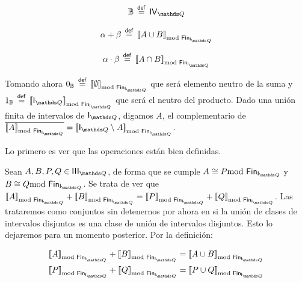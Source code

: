 \documentclass[final,12pt,a4paper,twoside,fleqn]{extbook}
\newcommand{\mathdef}{\ensuremath{\stackrel{\mathsf{def}}{{}={}}}}
\newcommand{\setB}{\ensuremath{\mathbb{B}}}
\theoremstyle{definition}
\theoremstyle{remark}
\begin{document}
\begin{equation}
\setB \mathdef \IVQ
\end{equation}



\begin{equation} 
\alpha + \beta \mathdef \ClEqFinDiff{A \cup B} 
\end{equation}



\begin{equation} 
\alpha \cdot \beta \mathdef \ClEqFinDiff{A \cap B} 
\end{equation} 



	Tomando ahora \( 0_{\setB} \mathdef \ClEqFinDiff{ \emptyset } \) que será
elemento neutro de la suma y \( 1_{\setB} \mathdef \ClEqFinDiff{ \IQ } \) que
será el neutro del producto. Dado una unión finita de intervalos de \(\IQ\),
digamos \(A\), el complementario de \( \overline{\ClEqFinDiff{ A }} =
\ClEqFinDiff{ \IQ \setminus A } \).



	Lo primero es ver que las operaciones están bien definidas. 



	Sean \(A,B,P,Q \in \IIIQ\), de forma que se cumple \(A \cong P
\FinDiffRel\) y \(B \cong Q \FinDiffRel\). Se trata de ver que
\(\ClEqFinDiff{A}+\ClEqFinDiff{B}=\ClEqFinDiff{P}+\ClEqFinDiff{Q}\). Las
trataremos como conjuntos sin detenernos por ahora en si la unión de clases
de intervalos disjuntos es una clase de unión de intervalos disjuntos. Esto
lo dejaremos para un momento posterior. Por la definición:



\begin{align}
&\ClEqFinDiff{A}+\ClEqFinDiff{B} = \ClEqFinDiff{A\cup B}\\
&\ClEqFinDiff{P}+\ClEqFinDiff{Q} = \ClEqFinDiff{P\cup Q}
\end{align}
\end{document}
